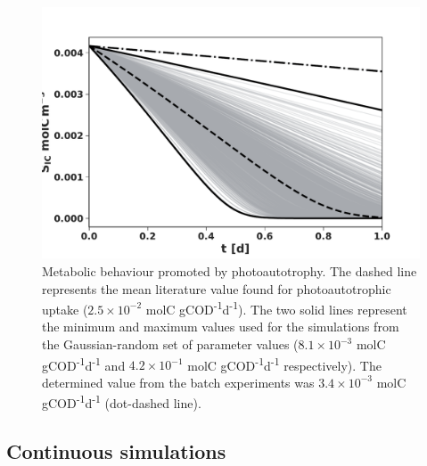 \begin{figure}[tp]
    \centering
    \includegraphics[width=1\linewidth]{./Chap2/simulations/ch2_auto.pdf}
    \caption{Metabolic behaviour promoted by photoautotrophy. The dashed line represents the mean literature value found for photoautotrophic uptake ($\mathrm{2.5 \times 10^{-2}}$ molC gCOD\textsuperscript{-1}d\textsuperscript{-1}). The two solid lines represent the minimum and maximum values used for the simulations from the Gaussian-random set of parameter values ($\mathrm{8.1 \times 10^{-3}}$ molC gCOD\textsuperscript{-1}d\textsuperscript{-1} and $\mathrm{4.2 \times 10^{-1}}$ molC gCOD\textsuperscript{-1}d\textsuperscript{-1} respectively). The determined value from the batch experiments was $\mathrm{3.4 \times 10^{-3}}$ molC gCOD\textsuperscript{-1}d\textsuperscript{-1} (dot-dashed line).}
    \label{fig:ch2_auto}
\end{figure}

\subsection{Continuous simulations}
